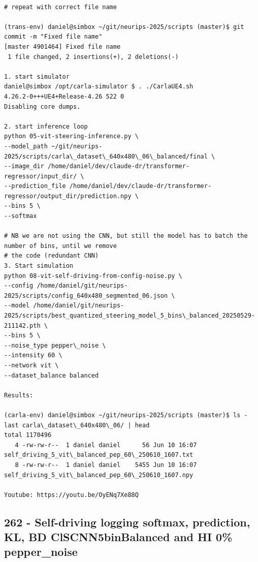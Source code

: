 \begin{verbatim}

# repeat with correct file name

(trans-env) daniel@simbox ~/git/neurips-2025/scripts (master)$ git commit -m "Fixed file name"
[master 4901464] Fixed file name
 1 file changed, 2 insertions(+), 2 deletions(-)
 
1. start simulator
daniel@simbox /opt/carla-simulator $ . ./CarlaUE4.sh 
4.26.2-0+++UE4+Release-4.26 522 0
Disabling core dumps.

2. start inference loop
python 05-vit-steering-inference.py \
--model_path ~/git/neurips-2025/scripts/carla\_dataset\_640x480\_06\_balanced/final \
--image_dir /home/daniel/dev/claude-dr/transformer-regressor/input_dir/ \
--prediction_file /home/daniel/dev/claude-dr/transformer-regressor/output_dir/prediction.npy \
--bins 5 \
--softmax

# NB we are not using the CNN, but still the model has to batch the number of bins, until we remove
# the code (redundant CNN)
3. Start simulation
python 08-vit-self-driving-from-config-noise.py \
--config /home/daniel/git/neurips-2025/scripts/config_640x480_segmented_06.json \
--model /home/daniel/git/neurips-2025/scripts/best_quantized_steering_model_5_bins\_balanced_20250529-211142.pth \
--bins 5 \
--noise_type pepper\_noise \
--intensity 60 \
--network vit \
--dataset_balance balanced

Results:

(carla-env) daniel@simbox ~/git/neurips-2025/scripts (master)$ ls -last carla\_dataset\_640x480\_06/ | head
total 1170496
   4 -rw-rw-r--  1 daniel daniel      56 Jun 10 16:07 self_driving_5_vit\_balanced_pep_60\_250610_1607.txt
   8 -rw-rw-r--  1 daniel daniel    5455 Jun 10 16:07 self_driving_5_vit\_balanced_pep_60\_250610_1607.npy

Youtube: https://youtu.be/OyENq7Xe88Q

\end{verbatim}

\subsection{262 - Self-driving logging softmax, prediction, KL, BD ClSCNN5binBalanced and HI 0\% pepper\_noise}
\label{app_res:262}

